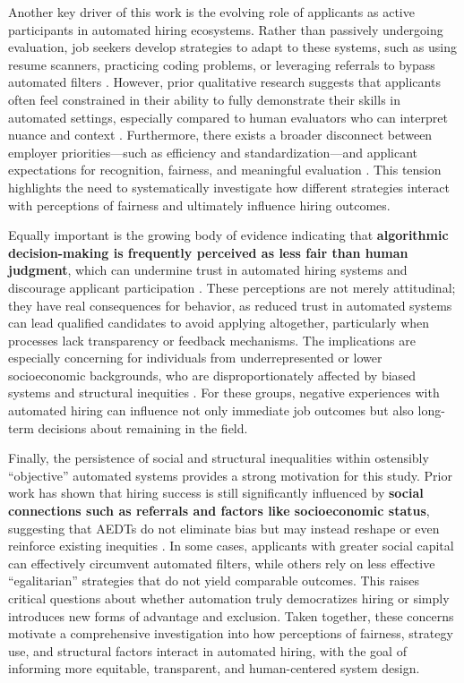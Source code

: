 Another key driver of this work is the evolving role of applicants as active participants in automated hiring ecosystems. Rather than passively undergoing evaluation, job seekers develop strategies to adapt to these systems, such as using resume scanners, practicing coding problems, or leveraging referrals to bypass automated filters \cite{4_armstrong2023navigating}. However, prior qualitative research suggests that applicants often feel constrained in their ability to fully demonstrate their skills in automated settings, especially compared to human evaluators who can interpret nuance and context \cite{4_armstrong2023navigating}. Furthermore, there exists a broader disconnect between employer priorities—such as efficiency and standardization—and applicant expectations for recognition, fairness, and meaningful evaluation \cite{26_giannakos2017understanding}. This tension highlights the need to systematically investigate how different strategies interact with perceptions of fairness and ultimately influence hiring outcomes.

Equally important is the growing body of evidence indicating that \textbf{algorithmic decision-making is frequently perceived as less fair than human judgment}, which can undermine trust in automated hiring systems and discourage applicant participation \cite{28_gonzalez2022allying,40_lee2017algorithmic}. These perceptions are not merely attitudinal; they have real consequences for behavior, as reduced trust in automated systems can lead qualified candidates to avoid applying altogether, particularly when processes lack transparency or feedback mechanisms. The implications are especially concerning for individuals from underrepresented or lower socioeconomic backgrounds, who are disproportionately affected by biased systems and structural inequities \cite{26_giannakos2017understanding,46_metaxa2018gender}. For these groups, negative experiences with automated hiring can influence not only immediate job outcomes but also long-term decisions about remaining in the field.

Finally, the persistence of social and structural inequalities within ostensibly “objective” automated systems provides a strong motivation for this study. Prior work has shown that hiring success is still significantly influenced by \textbf{social connections such as referrals and factors like socioeconomic status}, suggesting that AEDTs do not eliminate bias but may instead reshape or even reinforce existing inequities \cite{16_agyare2026why}. In some cases, applicants with greater social capital can effectively circumvent automated filters, while others rely on less effective “egalitarian” strategies that do not yield comparable outcomes. This raises critical questions about whether automation truly democratizes hiring or simply introduces new forms of advantage and exclusion. Taken together, these concerns motivate a comprehensive investigation into how perceptions of fairness, strategy use, and structural factors interact in automated hiring, with the goal of informing more equitable, transparent, and human-centered system design.

